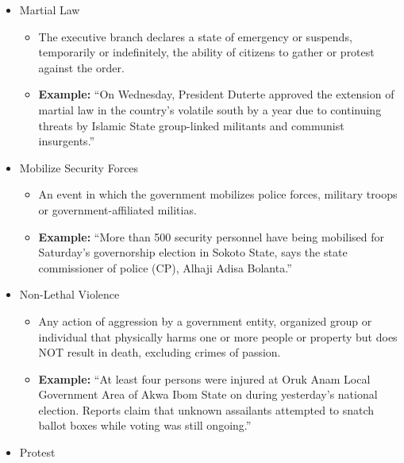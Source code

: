\documentclass[
  letterpaper,
  DIV=11,
  numbers=noendperiod]{scrartcl}
\providecommand{\tightlist}{%
  \setlength{\itemsep}{0pt}\setlength{\parskip}{0pt}}\usepackage{longtable,booktabs,array}
\begin{document}
\begin{itemize}
  \begin{itemize}
  \tightlist
  \item
    Any action of aggression by a government entity, organized group or
    individual that results in the death of one or more people,
    excluding crimes of passion.
  \item
    \textbf{Example:} ``The Kaduna state government, Friday evening,
    disclosed that 33 women and children were killed by rebels in Kajuru
    local government of Kaduna state, less than twenty-four hours to the
    conduct of the presidential and parliamentary elections.''
  \end{itemize}
\item
  Martial Law

  \begin{itemize}
  \tightlist
  \item
    The executive branch declares a state of emergency or suspends,
    temporarily or indefinitely, the ability of citizens to gather or
    protest against the order.
  \item
    \textbf{Example:} ``On Wednesday, President Duterte approved the
    extension of martial law in the country's volatile south by a year
    due to continuing threats by Islamic State group-linked militants
    and communist insurgents.''
  \end{itemize}
\item
  Mobilize Security Forces

  \begin{itemize}
  \tightlist
  \item
    An event in which the government mobilizes police forces, military
    troops or government-affiliated militias.
  \item
    \textbf{Example:} ``More than 500 security personnel have being
    mobilised for Saturday's governorship election in Sokoto State, says
    the state commissioner of police (CP), Alhaji Adisa Bolanta.''
  \end{itemize}
\item
  Non-Lethal Violence

  \begin{itemize}
  \tightlist
  \item
    Any action of aggression by a government entity, organized group or
    individual that physically harms one or more people or property but
    does NOT result in death, excluding crimes of passion.
  \item
    \textbf{Example:} ``At least four persons were injured at Oruk Anam
    Local Government Area of Akwa Ibom State on during yesterday's
    national election. Reports claim that unknown assailants attempted
    to snatch ballot boxes while voting was still ongoing.''
  \end{itemize}
\item
  Protest


\end{itemize}
\end{document}
